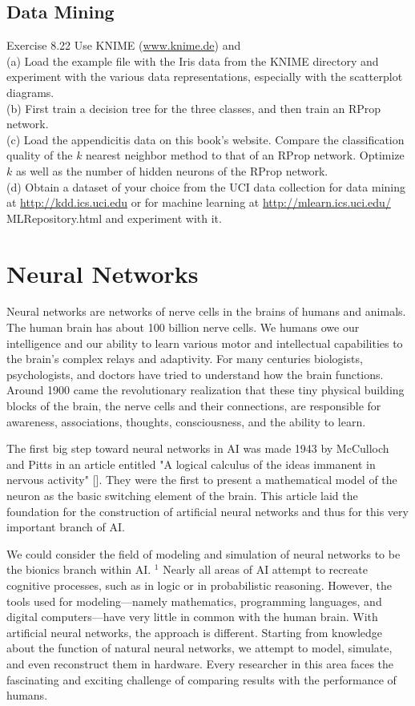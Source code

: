 \documentclass[10pt]{book}
\begin{document}
\subsection{Data Mining}
Exercise 8.22 Use KNIME (\href{http://www.knime.de}{www.knime.de}) and\\
(a) Load the example file with the Iris data from the KNIME directory and experiment with the various data representations, especially with the scatterplot diagrams.\\
(b) First train a decision tree for the three classes, and then train an RProp network.\\
(c) Load the appendicitis data on this book's website. Compare the classification quality of the $k$ nearest neighbor method to that of an RProp network. Optimize $k$ as well as the number of hidden neurons of the RProp network.\\
(d) Obtain a dataset of your choice from the UCI data collection for data mining at \href{http://kdd.ics.uci.edu}{http://kdd.ics.uci.edu} or for machine learning at \href{http://mlearn.ics.uci.edu/}{http://mlearn.ics.uci.edu/} MLRepository.html and experiment with it.
\section{Neural Networks}
Neural networks are networks of nerve cells in the brains of humans and animals. The human brain has about 100 billion nerve cells. We humans owe our intelligence and our ability to learn various motor and intellectual capabilities to the brain's complex relays and adaptivity. For many centuries biologists, psychologists, and doctors have tried to understand how the brain functions. Around 1900 came the revolutionary realization that these tiny physical building blocks of the brain, the nerve cells and their connections, are responsible for awareness, associations, thoughts, consciousness, and the ability to learn.

The first big step toward neural networks in AI was made 1943 by McCulloch and Pitts in an article entitled "A logical calculus of the ideas immanent in nervous activity" [\cite{anderson1988neurocomputing}]. They were the first to present a mathematical model of the neuron as the basic switching element of the brain. This article laid the foundation for the construction of artificial neural networks and thus for this very important branch of AI.

We could consider the field of modeling and simulation of neural networks to be the bionics branch within AI. ${ }^{1}$ Nearly all areas of AI attempt to recreate cognitive processes, such as in logic or in probabilistic reasoning. However, the tools used for modeling—namely mathematics, programming languages, and digital computers—have very little in common with the human brain. With artificial neural networks, the approach is different. Starting from knowledge about the function of natural neural networks, we attempt to model, simulate, and even reconstruct them in hardware. Every researcher in this area faces the fascinating and exciting challenge of comparing results with the performance of humans.
\end{document}
